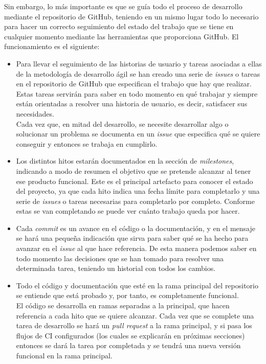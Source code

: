 Sin embargo, lo más importante es que se guía todo el proceso de desarrollo mediante el repositorio de GitHub, teniendo en un mismo lugar todo lo necesario para hacer un correcto seguimiento del estado del trabajo que se tiene en cualquier momento mediante las herramientas que proporciona GitHub. El funcionamiento es el siguiente:
\begin{itemize}
    \item Para llevar el seguimiento de las historias de usuario y tareas asociadas a ellas de la metodología de desarrollo ágil se han creado una serie de \textit{issues} o tareas en el repositorio de GitHub que especifican el trabajo que hay que realizar. Estas tareas servirán para saber en todo momento en qué trabajar y siempre están orientadas a resolver una historia de usuario, es decir, satisfacer sus necesidades.\\
    Cada vez que, en mitad del desarrollo, se necesite desarrollar algo o solucionar un problema se documenta en un \textit{issue} que especifica qué se quiere conseguir y entonces se trabaja en cumplirlo.
    \item Los distintos hitos estarán documentados en la sección de \textit{milestones}, indicando a modo de resumen el objetivo que se pretende alcanzar al tener ese producto funcional. Este es el principal artefacto para conocer el estado del proyecto, ya que cada hito indica una fecha límite para completarlo y una serie de \textit{issues} o tareas necesarias para completarlo por completo. Conforme estas se van completando se puede ver cuánto trabajo queda por hacer.
    \item Cada \textit{commit} es un avance en el código o la documentación, y en el mensaje se hará una pequeña indicación que sirva para saber qué se ha hecho para avanzar en el \textit{issue} al que hace referencia. De esta manera podemos saber en todo momento las decisiones que se han tomado para resolver una determinada tarea, teniendo un historial con todos los cambios.
    \item Todo el código y documentación que esté en la rama principal del repositorio se entiende que está probado y, por tanto, es completamente funcional. \\
    El código se desarrolla en ramas separadas a la principal, que hacen referencia a cada hito que se quiere alcanzar. Cada vez que se complete una tarea de desarrollo se hará un \textit{pull request} a la rama principal, y si pasa los flujos de CI configurados (los cuales se explicarán en próximas secciones) entonces se dará la tarea por completada y se tendrá una nueva versión funcional en la rama principal. 
\end{itemize}

